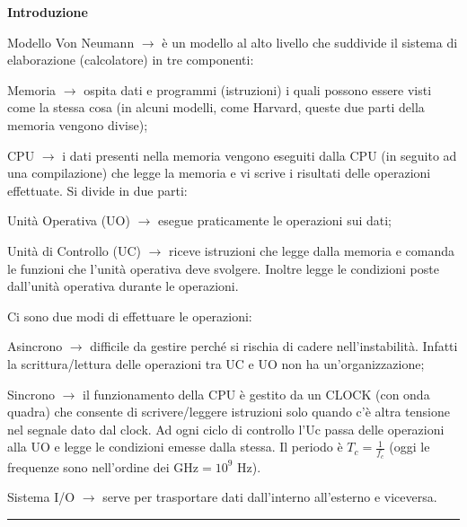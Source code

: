 \documentclass[8pt]{extarticle}
\newenvironment{formulario}
{
\setlength{\columnsep}{3em}
\twocolumn
\lstset{tabsize=3}
\begin{spacing}{1}
\begin{flushleft}
}{
\end{flushleft}
\end{spacing}
}
\newenvironment{tcenter}{
  \par
  \centering
  \setlength{\parskip}{0pt} %
  \noindent
}{
  \par
}
\newenvironment{Descr}
{
	\begin{description}[topsep=0pt,itemsep=0pt,partopsep=0pt, parsep=0pt]
}{
	\end{description}
}
\newenvironment{myParagraph}[1]
{
\begin{tcenter}
\textbf{#1}
\end{tcenter}
}{
\myRule
}
\newcommand{\myRule}{\rule{250pt}{0.1pt}}
\newcommand{\ra}{\rightarrow}
\begin{document}
\begin{formulario}

	\begin{myParagraph}{Introduzione}
		\begin{Descr}
			\item[Modello Von Neumann] $\ra$ è un modello al alto livello che suddivide il sistema di elaborazione (calcolatore) in tre componenti:
			\begin{Descr}
				\item[Memoria]  $\ra$ ospita dati e programmi (istruzioni) i quali possono essere visti come la stessa cosa (in alcuni modelli, come Harvard, queste due parti della memoria vengono divise);
				 \item[CPU]  $\ra$ i dati presenti nella memoria vengono eseguiti dalla CPU (in seguito ad una compilazione) che legge la memoria e vi scrive i risultati delle operazioni effettuate. Si divide in due parti:
				\begin{Descr}
					\item[Unità Operativa (UO)]  $\ra$ esegue praticamente le operazioni sui dati;
					\item[Unità di Controllo (UC)]  $\ra$ riceve istruzioni che legge dalla memoria e comanda le funzioni che l'unità operativa deve svolgere. Inoltre legge le condizioni poste dall'unità operativa durante le operazioni.
				\end{Descr}
				Ci sono due modi di effettuare le operazioni:
				\begin{Descr}
					\item[Asincrono] $\ra$ difficile da gestire perché si rischia di cadere nell'instabilità. Infatti la scrittura/lettura delle operazioni tra UC e UO non ha un'organizzazione;
					\item[Sincrono] $\ra$ il funzionamento della CPU è gestito da un CLOCK (con onda quadra) che consente di scrivere/leggere istruzioni solo quando c'è altra tensione nel segnale dato dal clock. Ad ogni ciclo di controllo l'Uc passa delle operazioni alla UO e legge le condizioni emesse dalla stessa. Il periodo è $T_c=\frac{1}{f_c}$ (oggi le frequenze sono nell'ordine dei $\text{GHz}=10^9 \text{ Hz}$). 
				\end{Descr}	
				\item[Sistema I/O]  $\ra$ serve per trasportare dati dall'interno all'esterno e viceversa.
			\end{Descr}
		\end{Descr}
	\end{myParagraph}
	

\end{formulario}
\end{document}
